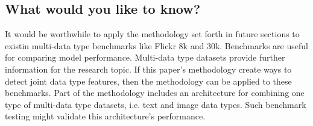 \subsection{What would you like to know?}

It would be worthwhile to apply the methodology set forth in future sections to existin multi-data type benchmarks like Flickr 8k and 30k.  Benchmarks are useful for comparing model performance.  Multi-data type datasets provide further information for the research topic.  If this paper's methodology create ways to detect joint data type features, then the methodology can be applied to these benchmarks.  Part of the methodology includes an architecture for combining one type of multi-data type datasets, i.e. text and image data types.  Such benchmark testing might validate this architecture's performance.

